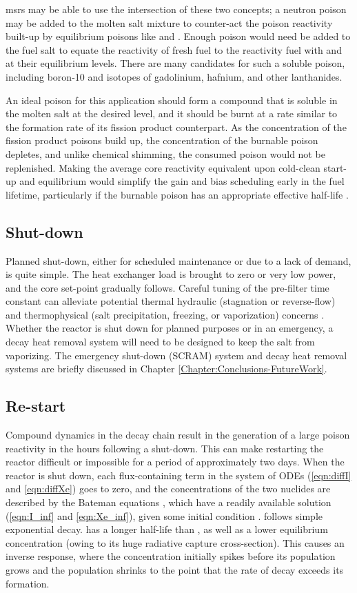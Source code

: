 \acsp{msr} may be able to use the intersection of these two concepts; a neutron poison may be added to the molten salt mixture to counter-act the poison reactivity built-up by equilibrium poisons like \Xe and \Sa. Enough poison would need be added to the fuel salt to equate the reactivity of fresh fuel to the reactivity fuel with \Xe and \Sa at their equilibrium levels. There are many candidates for such a soluble poison, including boron-10 and isotopes of gadolinium, hafnium, and other lanthanides.

An ideal poison for this application should form a compound that is soluble in the molten salt at the desired level, and it should be burnt at a rate similar to the formation rate of its fission product counterpart. As the concentration of the fission product poisons build up, the concentration of the burnable poison depletes, and unlike chemical shimming, the consumed poison would not be replenished. Making the average core reactivity equivalent upon cold-clean start-up and equilibrium would simplify the gain and bias scheduling early in the fuel lifetime, particularly if the burnable poison has an appropriate effective half-life \cite{RootGd}.

\subsection{Shut-down}
Planned shut-down, either for scheduled maintenance or due to a lack of demand, is quite simple. The heat exchanger load is brought to zero or very low power, and the core set-point gradually follows. Careful tuning of the pre-filter time constant can alleviate potential thermal hydraulic (\eg stagnation or reverse-flow) and thermophysical (\eg salt precipitation, freezing, or vaporization) concerns \cite{CarterNumerical}. Whether the reactor is shut down for planned purposes or in an emergency, a decay heat \cite{TodreasKazimi1} removal system will need to be designed to keep the salt from vaporizing. The emergency shut-down (SCRAM) system and decay heat removal systems are briefly discussed in Chapter \ref{Chapter:Conclusions-FutureWork}.  

\subsection{Re-start}
Compound dynamics in the \Xe decay chain result in the generation of a large poison reactivity in the hours following a shut-down. This can make restarting the reactor difficult or impossible for a period of approximately two days. When the reactor is shut down, each flux-containing term in the system of ODEs (\ref{eqn:diffI} and \ref{eqn:diffXe}) goes to zero, and the concentrations of the two nuclides are described by the Bateman equations \cite{Bateman}, which have a readily available solution (\ref{eqn:I_inf} and \ref{eqn:Xe_inf}), given some initial condition \cite{Lamarsh}. \I follows simple exponential decay. \Xe has a longer half-life than \I, as well as a lower equilibrium concentration (owing to its huge radiative capture cross-section). This causes an inverse response, where the \Xe concentration initially spikes before its population grows and the \I population shrinks to the point that the rate of \Xe decay exceeds its formation. 

